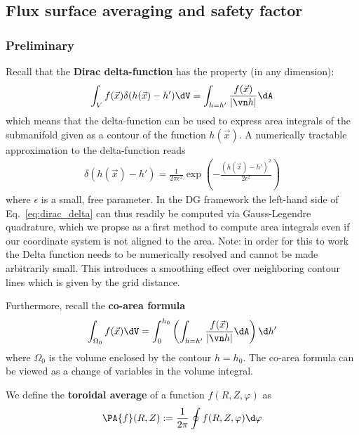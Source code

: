 \subsection{Flux surface averaging and safety factor}
\subsubsection{Preliminary}
Recall that the {\bf Dirac delta-function} has the property (in any dimension):
\begin{align} \label{eq:dirac_delta}
\int_V f(\vec x) \delta(h(\vec x) - h') \dV = \int_{h=h'} \frac{f(\vec x)}{|\vn h|} \dA
\end{align}
which means that the delta-function can be used to express area integrals of the
submanifold given as a contour of the function $h(\vec x)$.
A numerically tractable approximation to the delta-function reads
\begin{align}\label{eq:delta}
\delta(h(\vec x)-h') = \frac{1}{2\pi \epsilon^2}
\exp\left( - \frac{\left(h(\vec x)-h'\right)^2}{2\epsilon^2}\right)
\end{align}
where $\epsilon$ is a small, free parameter.
In the DG framework the left-hand side
of Eq.~\eqref{eq:dirac_delta} can thus readily be computed
via Gauss-Legendre quadrature, which we propse as a first method to compute area
integrals even if our coordinate system is not aligned to the area.
Note: in order for this to work the Delta function needs to be numerically
resolved and cannot be made arbitrarily small.
This introduces a smoothing effect
over neighboring contour lines which is given by the grid distance.

Furthermore, recall the {\bf co-area formula}
\begin{align} \label{eq:coarea}
\int_{\Omega_0} f(\vec x) \dV =
\int_0^{h_0} \left( \int_{h=h'} \frac{f(\vec x)}{|\vn h|}  \dA  \right) \d h'
\end{align}
where $\Omega_0$ is the volume enclosed by the contour $h=h_0$.
The co-area formula can be viewed as a change of variables in the
volume integral.

We define the {\bf toroidal average} of a function $f(R,Z,\varphi)$ as
\begin{align} \label{eq:phi_average}
\PA{ f}(R,Z) := \frac{1}{2\pi}\oint f(R,Z,\varphi)\d \varphi
\end{align}

